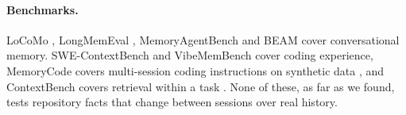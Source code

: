 \paragraph{Benchmarks.} LoCoMo \cite{maharana2024locomo}, LongMemEval \cite{wu2025longmemeval}, MemoryAgentBench \cite{hu2025memoryagentbench} and BEAM \cite{tavakoli2026beam} cover conversational memory. SWE-ContextBench \cite{zhu2026swecontextbench} and VibeMemBench \cite{vibemembench2026} cover coding experience, MemoryCode covers multi-session coding instructions on synthetic data \cite{rakotonirina2025memorycode}, and ContextBench covers retrieval within a task \cite{li2026contextbench}. None of these, as far as we found, tests repository facts that change between sessions over real history.
